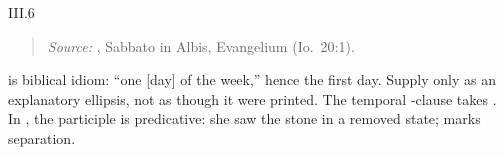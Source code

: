 \begin{courseunit}{III.6}
\begin{quote}

\emph{Source:} \Missal, Sabbato in Albis, Evangelium (Io.~20:1).
\end{quote}

 is biblical idiom: ``one [day] of the week,'' hence the
first day. Supply  only as an explanatory ellipsis, not as though it
were printed. The temporal -clause takes . In
, the participle is predicative: she saw the stone in a
removed state;  marks separation.




\end{courseunit}

